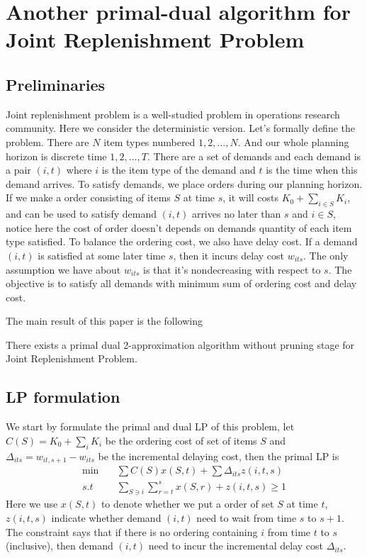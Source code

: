 \section{Another primal-dual algorithm for Joint Replenishment Problem}

\subsection{Preliminaries}
Joint replenishment problem is a well-studied problem in operations research community. Here we consider the deterministic version. Let's formally define the problem. There are $N$ item types numbered $1,2,\ldots,N$. And our whole planning horizon is discrete time $1,2,\ldots, T$. There are a set of demands and each demand is a pair $(i,t)$ where $i$ is the item type of the demand and $t$ is the time when this demand arrives. To satisfy demands, we place orders during our planning horizon. If we make a order consisting of items $S$ at time $s$, it will costs $K_0+\sum_{i\in S} K_i$, and can be used to satisfy demand $(i,t)$ arrives no later than $s$ and $i \in S$, notice here the cost of order doesn't depends on demands quantity of each item type satisfied. To balance the ordering cost, we also have delay cost. If a demand $(i,t)$ is satisfied at some later time $s$, then it incurs delay cost $w_{its}$. The only assumption we have about $w_{its}$ is that it's nondecreasing with respect to $s$. The objective is to satisfy all demands with minimum sum of ordering cost and delay cost.

The main result of this paper is the following
\begin{theorem}
There exists a primal dual 2-approximation algorithm without pruning stage for Joint Replenishment Problem.
\end{theorem}

\subsection{LP formulation}
We start by formulate the primal and dual LP of this problem, let $C(S) = K_0 + \sum_i K_i$ be the ordering cost of set of items $S$ and $\Delta_{its} = w_{it,s+1} - w_{its}$ be the incremental delaying cost, then the primal LP is
\begin{align}
	\min \quad & \sum C(S) x(S,t) + \sum \Delta_{its}z(i,t,s) \\
	s.t \quad& \sum_{S \ni i} \sum_{r=t}^s x(S,r) + z(i,t,s) \ge 1
\end{align}
Here we use $x(S,t)$ to denote whether we put a order of set $S$ at time $t$, $z(i,t,s)$ indicate whether demand $(i,t)$ need to wait from time $s$ to $s+1$. The constraint says that if there is no ordering containing $i$ from time $t$ to $s$(inclusive), then demand $(i,t)$ need to incur the incremental delay cost $\Delta_{its}$.

